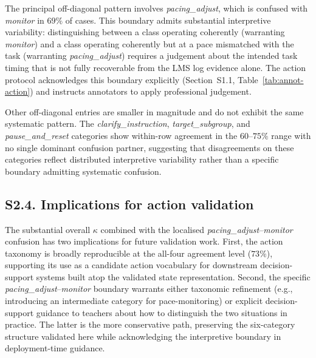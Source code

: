 \documentclass[preprint,12pt,authoryear]{elsarticle}
\begin{document}
The principal off-diagonal pattern involves \textit{pacing\_adjust}, which is confused with \textit{monitor} in $69\%$ of cases. This boundary admits substantial interpretive variability: distinguishing between a class operating coherently (warranting \textit{monitor}) and a class operating coherently but at a pace mismatched with the task (warranting \textit{pacing\_adjust}) requires a judgement about the intended task timing that is not fully recoverable from the LMS log evidence alone. The action protocol acknowledges this boundary explicitly (Section~S1.1, Table~\ref{tab:annot-action}) and instructs annotators to apply professional judgement.

Other off-diagonal entries are smaller in magnitude and do not exhibit the same systematic pattern. The \textit{clarify\_instruction}, \textit{target\_subgroup}, and \textit{pause\_and\_reset} categories show within-row agreement in the $60$--$75\%$ range with no single dominant confusion partner, suggesting that disagreements on these categories reflect distributed interpretive variability rather than a specific boundary admitting systematic confusion.

\subsection*{S2.4. Implications for action validation}
\label{supp:action-implications}

The substantial overall $\kappa$ combined with the localised \textit{pacing\_adjust}--\textit{monitor} confusion has two implications for future validation work. First, the action taxonomy is broadly reproducible at the all-four agreement level ($73\%$), supporting its use as a candidate action vocabulary for downstream decision-support systems built atop the validated state representation. Second, the specific \textit{pacing\_adjust}--\textit{monitor} boundary warrants either taxonomic refinement (e.g., introducing an intermediate category for pace-monitoring) or explicit decision-support guidance to teachers about how to distinguish the two situations in practice. The latter is the more conservative path, preserving the six-category structure validated here while acknowledging the interpretive boundary in deployment-time guidance.



\end{document}
